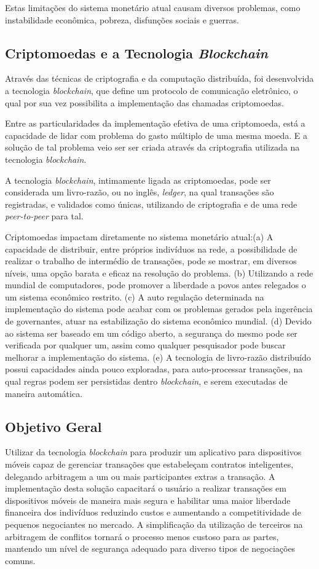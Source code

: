 \documentclass[
	article,			%
	11pt,				%
	oneside,			%
	a4paper,			%
	chapter=TITLE,		%
	section=TITLE,		%
	subsection=TITLE,	%
	subsubsection=TITLE, %
	english,			%
	brazil,				%
	sumario=tradicional
	]{ifrs-artigo-abntex2}
\begin{document}
Estas limitações do sistema monetário atual causam diversos problemas, como instabilidade econômica, pobreza, disfunções sociais e guerras.

\subsection{Criptomoedas e a Tecnologia \textit{Blockchain}}
Através das técnicas de criptografia e da computação distribuída, foi desenvolvida a tecnologia \textit{blockchain}, que define um protocolo de comunicação eletrônico, o qual por sua vez possibilita a implementação das chamadas criptomoedas.

Entre as particularidades da implementação efetiva de uma criptomoeda, está a capacidade de lidar com problema do gasto múltiplo de uma mesma moeda. E a solução de tal problema veio ser ser criada através da criptografia utilizada na tecnologia \textit{blockchain}.

A tecnologia \textit{blockchain}, intimamente ligada as criptomoedas, pode ser considerada um livro-razão, ou no inglês, \textit{ledger}, na qual transações são registradas, e validados como únicas, utilizando de criptografia e de uma rede \textit{peer-to-peer} para tal.

Criptomoedas impactam diretamente no sistema monetário atual:(a) A capacidade de distribuir, entre próprios indivíduos na rede, a possibilidade de realizar o trabalho de intermédio de transações, pode se mostrar, em diversos níveis, uma opção barata e eficaz na resolução do problema. (b) Utilizando a rede mundial de computadores, pode promover a liberdade a povos antes relegados o um sistema econômico restrito. (c) A auto regulação determinada na implementação do sistema pode acabar com os problemas gerados pela ingerência de governantes,  atuar na estabilização do sistema econômico mundial. (d) Devido ao sistema ser baseado em um código aberto, a segurança do mesmo pode ser verificada por qualquer um, assim como qualquer pesquisador pode buscar melhorar a implementação do sistema. (e) A tecnologia de livro-razão distribuído possui capacidades ainda pouco exploradas, para auto-processar transações, na qual regras podem ser persistidas dentro \textit{blockchain}, e serem executadas de maneira automática.

\subsection{Objetivo Geral}
Utilizar da tecnologia \textit{blockchain} para produzir um aplicativo para dispositivos móveis capaz de gerenciar transações que estabeleçam contratos inteligentes, delegando arbitragem a um ou mais participantes extras a transação. A implementação desta solução capacitará o usuário a realizar transações em dispositivos móveis de maneira mais segura e habilitar uma maior liberdade financeira dos indivíduos reduzindo custos e aumentando a competitividade de pequenos negociantes no mercado. A simplificação da utilização de terceiros na arbitragem de conflitos tornará o processo menos custoso para as partes, mantendo um nível de segurança adequado para diverso tipos de negociações comuns.
\end{document}
